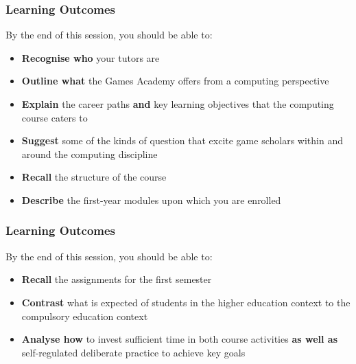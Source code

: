 \usepackage{../../beamerthemeFalmouthGamesAcademy}
\usepackage{multimedia}
\graphicspath{ {../../} }


\usepackage[normalem]{ulem}
\usepackage{wasysym}
\usepackage[T1]{fontenc}
\usepackage{pdfpages}

\usetikzlibrary{arrows,automata}







\title{\sessionnumber}
\subtitle{\modulecode: \moduletitle}

\frame{\titlepage} 

\begin{frame}
	\frametitle{Learning Outcomes}
	
	By the end of this session, you should be able to:
	
	\begin{itemize}
		\item \textbf{Recognise who} your tutors are
		\item \textbf{Outline what} the Games Academy offers from a computing perspective
		\item \textbf{Explain} the career paths \textbf{and} key learning objectives that the computing course caters to
		\item \textbf{Suggest} some of the kinds of question that excite game scholars within and around the computing discipline
		\item \textbf{Recall} the structure of the course
		\item \textbf{Describe} the first-year modules upon which you are enrolled
	\end{itemize}
\end{frame}

\begin{frame}
	\frametitle{Learning Outcomes}
	
	By the end of this session, you should be able to:
	
	\begin{itemize}
		\item \textbf{Recall} the assignments for the first semester
		\item \textbf{Contrast} what is expected of students in the higher education context to the compulsory education context
		\item \textbf{Analyse how} to invest sufficient time in both course activities \textbf{as well as} self-regulated deliberate practice to achieve key goals
	\end{itemize}
\end{frame}

